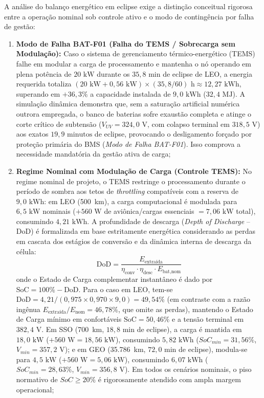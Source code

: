 A análise do balanço energético em eclipse exige a distinção conceitual rigorosa entre a operação nominal sob controle ativo e o modo de contingência por falha de gestão:
\begin{enumerate}[label=(\alph*),leftmargin=*]
    \item \textbf{Modo de Falha BAT-F01 (Falha do TEMS / Sobrecarga sem Modulação):} Caso o sistema de gerenciamento térmico-energético (TEMS) falhe em modular a carga de processamento e mantenha o nó operando em plena potência de $20\text{ kW}$ durante os $35{,}8\text{ min}$ de eclipse de LEO, a energia requerida totaliza $(20\text{ kW} + 0{,}56\text{ kW}) \times (35{,}8/60)\text{ h} \approx 12{,}27\text{ kWh}$, superando em $+36{,}3\%$ a capacidade instalada de $9{,}0\text{ kWh}$ ($32{,}4\text{ MJ}$). A simulação dinâmica demonstra que, sem a saturação artificial numérica outrora empregada, o banco de baterias sofre exaustão completa e atinge o corte crítico de subtensão ($V_{UV} = 324{,}0\text{ V}$, com colapso terminal em $318{,}5\text{ V}$) aos exatos $19{,}9\text{ minutos}$ de eclipse, provocando o desligamento forçado por proteção primária do BMS (\textit{Modo de Falha BAT-F01}). Isso comprova a necessidade mandatória da gestão ativa de carga;
\item \textbf{Regime Nominal com Modulação de Carga (Controle TEMS):} No regime nominal de projeto, o TEMS restringe o processamento durante o período de sombra aos tetos de \textit{throttling} compatíveis com a reserva de $9{,}0\text{ kWh}$: em LEO (500~km), a carga computacional é modulada para $6{,}5\text{ kW}$ nominais ($+560\text{ W}$ de aviônica/cargas essenciais $= 7{,}06\text{ kW}$ total), consumindo $4{,}21\text{ kWh}$. A profundidade de descarga (\textit{Depth of Discharge} -- DoD) é formalizada em base estritamente energética considerando as perdas em cascata dos estágios de conversão e da dinâmica interna de descarga da célula:
\begin{equation}
    \mathrm{DoD} = \frac{E_{\text{extraída}}}{\eta_{\text{conv}} \cdot \eta_{\text{desc}} \cdot E_{\text{bat,nom}}}
    \label{eq:dod_formal_def}
\end{equation}
onde o Estado de Carga complementar instantâneo é dado por $\mathrm{SoC} = 100\% - \mathrm{DoD}$. Para o caso em LEO, tem-se $\mathrm{DoD} = 4{,}21 / (0{,}975 \times 0{,}970 \times 9{,}0) = 49{,}54\%$ (em contraste com a razão ingênua $E_{\text{extraída}}/E_{\text{nom}} = 46{,}78\%$, que omite as perdas), mantendo o Estado de Carga mínimo em confortáveis $\mathrm{SoC} = 50{,}46\%$ e a tensão terminal em $382{,}4\text{ V}$. Em SSO (700~km, $18{,}8\text{ min}$ de eclipse), a carga é mantida em $18{,}0\text{ kW}$ ($+560\text{ W} = 18{,}56\text{ kW}$), consumindo $5{,}82\text{ kWh}$ ($SoC_{min} = 31{,}56\%$, $V_{min} = 357{,}2\text{ V}$); e em GEO (35.786~km, $72{,}0\text{ min}$ de eclipse), modula-se para $4{,}5\text{ kW}$ ($+560\text{ W} = 5{,}06\text{ kW}$), consumindo $6{,}07\text{ kWh}$ ($SoC_{min} = 28{,}63\%$, $V_{min} = 356{,}8\text{ V}$). Em todos os cenários nominais, o piso normativo de $SoC \ge 20\%$ é rigorosamente atendido com ampla margem operacional;

\end{enumerate}
